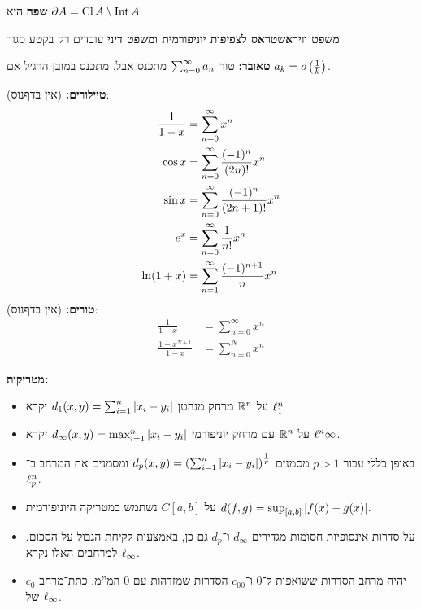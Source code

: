 \documentclass[]{../../../../tex/classes/styledArticle}
\begin{document}
	\textbf{שפה} היא $\partial A = \operatorname{Cl} A \setminus \operatorname{Int} A$
	
	\textbf{משפט וויראשטראס לצפיפות יוניפורמית ומשפט דיני} עובדים רק בקטע סגור
	
	\textbf{טאובר: }טור $\sum_{n = 0}^{\infty} a_n$ מתכנס אבל, מתכנס במובן הרגיל אם $a_k = o\left ( \frac{1}{k} \right )$. 
	
	\textbf{טיילורים: }(אין בדףנוס): 
	\begin{align*}
		\frac{1}{1 - x} &= \sum_{n = 0}^{\infty}x^{n} \\
		\cos x &= \sum_{n = 0}^{\infty}\frac{(-1)^{n}}{(2n)!}x^{n} \\
		\sin x &= \sum_{n = 0}^{\infty}\frac{(-1)^{n}}{(2n + 1)!}x^{n} \\
		e^{x} &= \sum_{n = 0}^{\infty}\frac{1}{n!}x^{n} \\
		\ln(1 + x) &= \sum_{n = 1}^{\infty} \frac{(-1)^{n + 1}}{n}x^{n}
	\end{align*}
	\textbf{טורים: }(אין בדףנוס): 
	\begin{align*}
		\frac{1}{1 - x} &= \sum_{n = 0}^{\infty}x^{n} \\
		\frac{1 - x^{N + 1}}{1 - x} &= \sum_{n = 0}^{N}x^{n}
	\end{align*}
	
	\textbf{מטריקות: }
	\begin{itemize}
		\item על $\mathbb{R}^{n}$ מרחק מנהטן $d_1(x, y) = \sum_{i = 1}^{n}\left \lvert x_i -y_i \right \rvert$ יקרא $\ell_1^{n}$
		\item על $\mathbb{R}^{n}$ עם מרחק יוניפורמי $d_{\infty}(x, y) = \max_{i =1}^{n}\left \lvert x_i - y_i \right \rvert$ יקרא $\ell^{n}\infty$. 
		\item באופן כללי עבור $p >1$ מסמנים $d_{p}(x, y) = \left ( \sum_{i = 1}^{n}\left \lvert x_i - y_i \right \rvert \right )^{\frac{1}{p}}$ ומסמנים את המרחב ב־$\ell_p^{n}$. 
		\item על $C[a, b]$ נשתמש במטריקה היוניפורמית $d(f, g) = \sup_{[a, b]}\left \lvert f(x) - g(x) \right \rvert$. 
		\item על סדרות אינסופיות חסומות מגדירים $d_{\infty}$ ו־$d_p$ גם כן, באמצעות לקיחת הגבול על הסכום. למרחבים האלו נקרא $\ell_{\infty}$. 
		\item $c_0$ יהיה מרחב הסדרות ששואפות ל־$0$ ו־$c_{00}$ הסדרות שמזדהות עם $0$ המ''מ, כתת־מרחב של $\ell_{\infty}$. 
	\end{itemize}
	
	
	
	
	
	
	\ndoc
\end{document}
